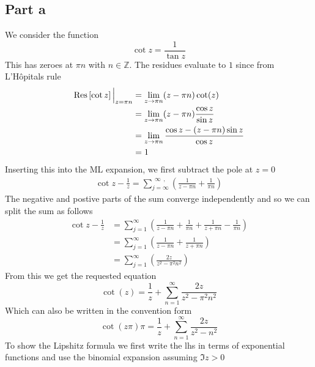 \documentclass[a4paper,12pt]{article}
\begin{document}
\subsection*{Part a}
We consider the function
\begin{equation}
\cot z=\frac{1}{\tan z}
\end{equation}
This has zeroes at $\pi n$ with $n\in \mathds {Z}$. The residues evaluate to $1$ since from L'Hôpitals rule
\begin{equation}
\begin{aligned}
\Res\left[\cot z\right]\Big|_{z=\pi n}&=\lim_{z\to\pi n}(z-\pi n)\cot( z)\\
&=\lim_{z\to\pi n}(z-\pi n)\frac{\cos z}{\sin z}\\
&=\lim_{z\to\pi n}\frac{\cos z-(z-\pi n)\sin z}{\cos z}\\
&=1
\end{aligned}
\end{equation}
Inserting this into the ML expansion, we first subtract the pole at $z=0$
\begin{equation}
\begin{aligned}
\cot z-\frac{1}{z}=\sum_{j=\infty}^{~~\infty ~~,}\left(\frac{1}{z-\pi n}+\frac{1}{\pi n}\right)
\end{aligned}
\end{equation}
The negative and postive parts of the sum converge independently and so we can split the sum as follows
\begin{equation}
	\begin{aligned}
		\cot z-\frac{1}{z}
				&=\sum_{j=1}^{\infty}\left(\frac{1}{z-\pi n}+\frac{1}{\pi n}+\frac{1}{z+\pi n}-\frac{1}{\pi n}\right)\\
		&=\sum_{j=1}^{\infty}\left(\frac{1}{z-\pi n}+\frac{1}{z+\pi n}\right)\\
		&=\sum_{j=1}^{\infty}\left(\frac{2z}{z^2-\pi^2 n^2}\right)
	\end{aligned}
\end{equation}
From this we get the requested equation
\begin{equation} 
	\cot(z)=\frac{1}{z}+\sum_{n=1}^{\infty}\frac{2z}{z^2-\pi^2 n^2}
\end{equation}
Which can also be written in the convention form
\begin{equation} \label{eq:expansion}
	\cot(z\pi)\pi=\frac{1}{z}+\sum_{n=1}^{\infty}\frac{2z}{z^2-n^2}
\end{equation}
To show the Lipshitz formula we first write the lhs in terms of exponential functions and use the binomial expansion assuming $\Im z>0$
\end{document}
